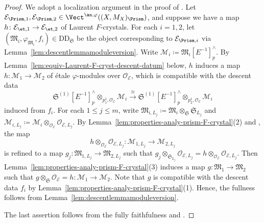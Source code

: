 \begin{proof}
We adopt a localization argument in the proof of 
\cite[Thm.~3.29(i)]{du-liu-moon-shimizu-completed-prismatic-F-crystal-loc-system}. Let $\mathcal{E}_{\Prism, 1}, \mathcal{E}_{\Prism, 2} \in \Vect^{\an,\varphi}((X,M_X)_\Prism)$, and suppose we have a map $h\colon \mathcal{E}_{\et, 1} \rightarrow \mathcal{E}_{\et, 2}$ of Laurent $F$-crystals. For each $i = 1, 2$, let $(\mathfrak{M}_i, \varphi_{\mathfrak{M}_i}, f_i) \in \mathrm{DD}_{\mathfrak{S}}$ be the object corresponding to $\mathcal{E}_{\Prism, i}$ via Lemma~\ref{lem:descentlemmamoduleversion}. Write $\mathcal{M}_i \coloneqq \mathfrak{M}_i[E^{-1}]^{\wedge}_p$. By Lemma~\ref{lem:equiv-Laurent-F-cryst-descent-datum} below, $h$ induces a map $h\colon \mathcal{M}_1 \rightarrow \mathcal{M}_2$
of \'etale $\varphi$-modules over $\mathcal{O}_{\mathcal{E}}$, which is compatible with the descent data
\[
\mathfrak{S}^{(1)}[E^{-1}]^{\wedge}_p \otimes_{p^1_1, \mathcal{O}_{\mathcal{E}}} \mathcal{M}_i \xrightarrow{\cong} \mathfrak{S}^{(1)}[E^{-1}]^{\wedge}_p\otimes_{p^1_2, \mathcal{O}_{\mathcal{E}}} \mathcal{M}_i
\]
induced from $f_i$. For each $1 \leq j \leq m$, write $\mathfrak{M}_{i, L_j} \coloneqq \mathfrak{M}_i\otimes_{\mathfrak{S}} \mathfrak{S}_{L_j}$ and $\mathcal{M}_{i, L_j} \coloneqq \mathcal{M}_i\otimes_{\mathcal{O}_{\mathcal{E}}} \mathcal{O}_{\mathcal{E}, L_j}$. By Lemma~\ref{lem:properties-analy-prism-F-crystal}(2) and \cite[Prop.~4.2.7]{gao-integral-padic-hodge-imperfect}, the map
\[
h\otimes_{\mathcal{O}_{\mathcal{E}}}\mathcal{O}_{\mathcal{E}, L_j} \colon \mathcal{M}_{1, L_j} \rightarrow \mathcal{M}_{2, L_j}
\]
is refined to a map $g_j\colon \mathfrak{M}_{1, L_j} \rightarrow \mathfrak{M}_{2, L_j}$ such that $g_j\otimes_{\mathfrak{S}_{L_j}} \mathcal{O}_{\mathcal{E}, L_j} = h\otimes_{\mathcal{O}_{\mathcal{E}}}\mathcal{O}_{\mathcal{E}, L_j}$. Then Lemma~\ref{lem:properties-analy-prism-F-crystal}(3) induces a map $g\colon \mathfrak{M}_1 \rightarrow \mathfrak{M}_2$
such that $g\otimes_{\mathfrak{S}} \mathcal{O}_{\mathcal{E}} = h \colon \mathcal{M}_1 \rightarrow \mathcal{M}_2$. Note that $g$ is compatible with the descent data $f_i$ by Lemma~\ref{lem:properties-analy-prism-F-crystal}(1). Hence, the fullness follows from Lemma~\ref{lem:descentlemmamoduleversion}. 

The last assertion follows from the fully faithfulness and \cite[Thm.~7.8]{mathew-descent}. 
\end{proof}


